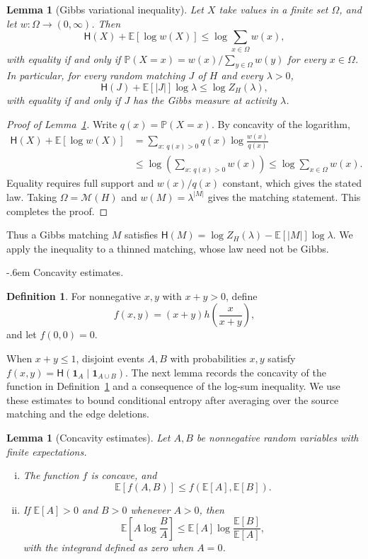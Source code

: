 \documentclass[11pt,reqno]{amsart}
\makeatletter
\numberwithin{equation}{section}
\renewcommand{\paragraph}{\@startsection{paragraph}{4}%
    \z@{.75\linespacing\@plus.2\linespacing\@minus.1\linespacing}%
    {-.6em}%
    {\normalfont\bfseries}}
\theoremstyle{plain}
\newtheorem{lemma}[theorem]{Lemma}
\theoremstyle{definition}
\newtheorem{definition}[theorem]{Definition}
\newcommand{\calM}{\mathcal{M}}
\newcommand{\E}{\mathbb E}
\newcommand{\Prob}{\mathbb P}
\newcommand{\HH}{\mathsf H}
\makeatother
\begin{document}
\begin{lemma}[Gibbs variational inequality]\label{lem:entropy-counting}
    Let $X$ take values in a finite set $\Omega$, and let $w:\Omega\to(0,\infty)$.
    Then
    \[
        \HH(X)+\E[\log w(X)]\le\log\sum_{x\in\Omega}w(x),
    \]
    with equality if and only if $\Prob(X=x)=w(x)/\sum_{y\in\Omega}w(y)$ for every $x\in\Omega$.
    In particular, for every random matching $J$ of $H$ and every $\lambda>0$,
    \[
        \HH(J)+\E[|J|]\log\lambda\le\log Z_H(\lambda),
    \]
    with equality if and only if $J$ has the Gibbs measure at activity $\lambda$.
\end{lemma}
\begin{proof}[Proof of Lemma~\ref{lem:entropy-counting}]
    Write $q(x)=\Prob(X=x)$.
    By concavity of the logarithm,
    \[
        \begin{aligned}
            \HH(X)+\E[\log w(X)]
            &=\sum_{x:\,q(x)>0}q(x)\log\frac{w(x)}{q(x)}\\
            &\le\log\left(\sum_{x:\,q(x)>0}w(x)\right)
            \le\log\sum_{x\in\Omega}w(x).
        \end{aligned}
    \]
    Equality requires full support and $w(x)/q(x)$ constant, which gives the stated law.
    Taking $\Omega=\calM(H)$ and $w(M)=\lambda^{|M|}$ gives the matching statement.
    This completes the proof.
\end{proof}

Thus a Gibbs matching $M$ satisfies $\HH(M)=\log Z_H(\lambda)-\E[|M|]\log\lambda$.
We apply the inequality to a thinned matching, whose law need not be Gibbs.

\paragraph{Concavity estimates.}
\begin{definition}\label{def:entropy-f}
    For nonnegative $x,y$ with $x+y>0$, define
    \[
        f(x,y)=(x+y)h\left(\frac{x}{x+y}\right),
    \]
    and let $f(0,0)=0$.
\end{definition}
When $x+y\le1$, disjoint events $A,B$ with probabilities $x,y$ satisfy $f(x,y)=\HH(\mathbf1_A\mid\mathbf1_{A\cup B})$.
The next lemma records the concavity of the function in Definition~\ref{def:entropy-f} and a consequence of the log-sum inequality. We use these estimates to bound conditional entropy after averaging over the source matching and the edge deletions.

\begin{lemma}[Concavity estimates]\label{lem:entropyconcavity}
    Let $A,B$ be nonnegative random variables with finite expectations.
    \begin{enumerate}[(i)]
        \item The function $f$ is concave, and
            \[
                \E[f(A,B)]\le f(\E[A],\E[B]).
            \]
        \item If $\E[A]>0$ and $B>0$ whenever $A>0$, then
            \[
                \E\left[A\log\frac BA\right]\le\E[A]\log\frac{\E[B]}{\E[A]},
            \]
            with the integrand defined as zero when $A=0$.
    \end{enumerate}
\end{lemma}
\end{document}
